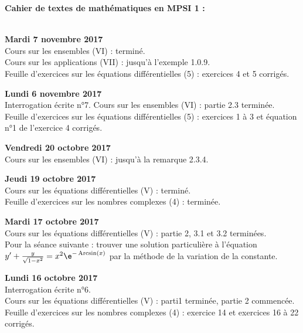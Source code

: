 \documentclass[12pt,a4paper]{article}
\begin{document}
\begin{center}
\Large\bf Cahier de textes de mathématiques en MPSI 1 :
\end{center}
\vspace{1cm}
\vspace{.4cm}\\

\noindent\textbf{Mardi 7 novembre 2017}\\
\bu{} Cours sur les ensembles (VI) : terminé. \\
\bu{} Cours sur les applications (VII) : jusqu'à l'exemple 1.0.9. \\
\bu{} Feuille d'exercices sur les équations différentielles (5) : exercices 4 et 5 corrigés. \\
\vspace{.4cm}

\noindent\textbf{Lundi 6 novembre 2017}\\
\bu{} Interrogation écrite n°7. 
\bu{} Cours sur les ensembles (VI) : partie 2.3 terminée. \\
\bu{} Feuille d'exercices sur les équations différentielles (5) : exercices 1 à 3 et équation n°1 de l'exercice 4 corrigés. \\
\vspace{.4cm}

\noindent\textbf{Vendredi 20 octobre 2017}\\
\bu{} Cours sur les ensembles (VI) : jusqu'à la remarque 2.3.4. \\
\vspace{.4cm}

\noindent\textbf{Jeudi 19 octobre 2017}\\
\bu{} Cours sur les équations différentielles (V) : terminé. \\
\bu{} Feuille d'exercices sur les nombres complexes (4) : terminée.\\
\vspace{.4cm}

\noindent\textbf{Mardi 17 octobre 2017}\\
\bu{} Cours sur les équations différentielles (V) : partie 2, 3.1 et 3.2 terminées. \\
\bu{} Pour la séance suivante : trouver une solution particulière à l'équation $y' + \frac{y}{\sqrt{1-x^2}} = x^2 \e^{-\Arcsin(x)}$ par la méthode de la variation de la constante. \\
\vspace{.4cm}

\noindent\textbf{Lundi 16 octobre 2017}\\
\bu{} Interrogation écrite n°6.\\
\bu{} Cours sur les équations différentielles (V) : parti1 terminée, partie 2 commencée. \\
\bu{} Feuille d'exercices sur les nombres complexes (4) : exercice 14 et exercices 16 à 22 corrigés. \\
\vspace{.4cm}
\end{document}
